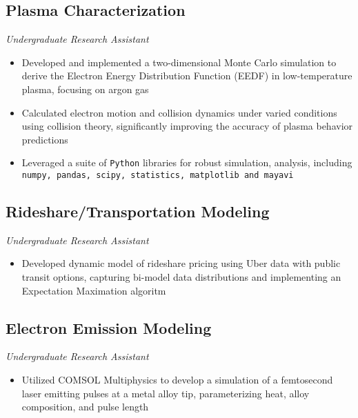 \documentclass[11pt,a4paper]{article}
\newenvironment{myitemize}
{ \begin{itemize}[label={--}, leftmargin=*]
    \setlength{\itemsep}{0pt}
    \setlength{\parskip}{0pt}
    \setlength{\parsep}{0pt}     }
{ \end{itemize}                  }
\begin{document}
\subsection*{Plasma Characterization \hfill {} }
\vspace{-1.5mm} %
\textit{Undergraduate Research Assistant}
\vspace{-1.5mm} %
\begin{myitemize}
\item Developed and implemented a two-dimensional Monte Carlo simulation to derive the Electron Energy Distribution Function (EEDF) in low-temperature plasma, focusing on argon gas
\item Calculated electron motion and collision dynamics under varied conditions using collision theory, significantly improving the accuracy of plasma behavior predictions
\item Leveraged a suite of \texttt{Python} libraries for robust simulation, analysis, including \texttt{numpy, pandas, scipy, statistics, matplotlib and mayavi}
\end{myitemize}

\subsection*{Rideshare/Transportation Modeling \hfill {} }
\vspace{-1.5mm} %
\textit{Undergraduate Research Assistant}
\vspace{-1.5mm} %
\begin{myitemize}
\item Developed dynamic model of rideshare pricing using Uber data with public transit options, capturing bi-model data distributions and implementing an Expectation Maximation algoritm

\end{myitemize}
\subsection*{Electron Emission Modeling \hfill {} }
\vspace{-1.5mm} %
\textit{Undergraduate Research Assistant}
\vspace{-1.5mm} %
\begin{myitemize}
\item Utilized COMSOL Multiphysics to develop a simulation of a femtosecond laser emitting pulses at a metal alloy tip, parameterizing heat, alloy composition, and pulse length
\end{myitemize}
\end{document}

